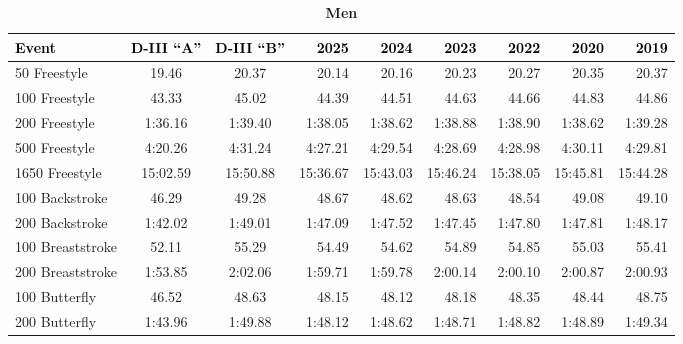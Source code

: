 \clearpage


\begin{table}[htbp]
\centering
\caption*{\textbf{\textcolor{teamprimary}{Men}}}
\renewcommand{\arraystretch}{1.2}
\scriptsize
\begin{tabularx}{\textwidth}{lccrrrrrr}
\toprule
\rowcolor{teamprimary!25}
\textbf{\textcolor{black}{Event}} & \textbf{\textcolor{black}{D-III ``A''}} & \textbf{\textcolor{black}{D-III ``B''}} & \textbf{\textcolor{black}{2025}} & \textbf{\textcolor{black}{2024}} & \textbf{\textcolor{black}{2023}} & \textbf{\textcolor{black}{2022}} & \textbf{\textcolor{black}{2020}} & \textbf{\textcolor{black}{2019}} \\
\midrule
\rowcolor{teamsecondary!12}
50 Freestyle & 19.46 & 20.37 & 20.14 & 20.16 & 20.23 & 20.27 & 20.35 & 20.37 \\
\rowcolor{teamprimary!8}
100 Freestyle & 43.33 & 45.02 & 44.39 & 44.51 & 44.63 & 44.66 & 44.83 & 44.86 \\
\rowcolor{teamsecondary!12}
200 Freestyle & 1:36.16 & 1:39.40 & 1:38.05 & 1:38.62 & 1:38.88 & 1:38.90 & 1:38.62 & 1:39.28 \\
\rowcolor{teamprimary!8}
500 Freestyle & 4:20.26 & 4:31.24 & 4:27.21 & 4:29.54 & 4:28.69 & 4:28.98 & 4:30.11 & 4:29.81 \\
\rowcolor{teamsecondary!12}
1650 Freestyle & 15:02.59 & 15:50.88 & 15:36.67 & 15:43.03 & 15:46.24 & 15:38.05 & 15:45.81 & 15:44.28 \\
\rowcolor{teamprimary!8}
100 Backstroke & 46.29 & 49.28 & 48.67 & 48.62 & 48.63 & 48.54 & 49.08 & 49.10 \\
\rowcolor{teamsecondary!12}
200 Backstroke & 1:42.02 & 1:49.01 & 1:47.09 & 1:47.52 & 1:47.45 & 1:47.80 & 1:47.81 & 1:48.17 \\
\rowcolor{teamprimary!8}
100 Breaststroke & 52.11 & 55.29 & 54.49 & 54.62 & 54.89 & 54.85 & 55.03 & 55.41 \\
\rowcolor{teamsecondary!12}
200 Breaststroke & 1:53.85 & 2:02.06 & 1:59.71 & 1:59.78 & 2:00.14 & 2:00.10 & 2:00.87 & 2:00.93 \\
\rowcolor{teamprimary!8}
100 Butterfly & 46.52 & 48.63 & 48.15 & 48.12 & 48.18 & 48.35 & 48.44 & 48.75 \\
\rowcolor{teamsecondary!12}
200 Butterfly & 1:43.96 & 1:49.88 & 1:48.12 & 1:48.62 & 1:48.71 & 1:48.82 & 1:48.89 & 1:49.34 \\

\end{tabularx}
\end{table}
